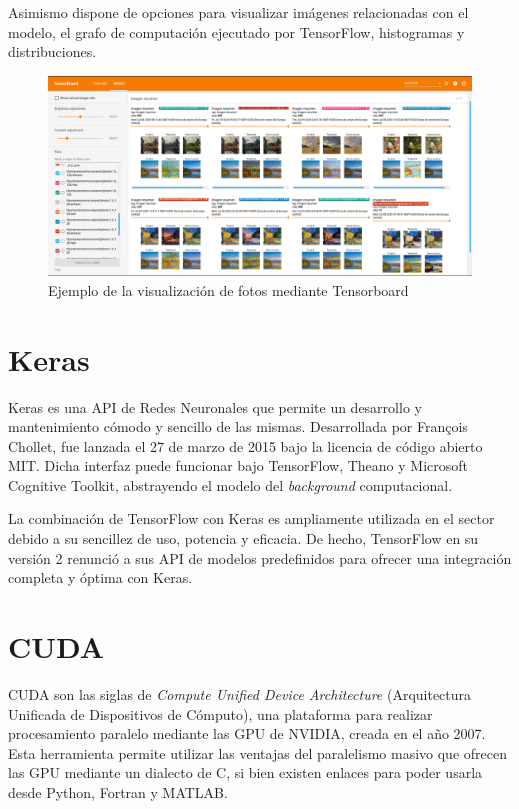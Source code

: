 \documentclass[../main.tex]{subfiles}
\begin{document}
Asimismo dispone de opciones para visualizar imágenes relacionadas con el modelo, el grafo de computación ejecutado por TensorFlow, histogramas y distribuciones.

\begin{figure}[h!]
    \centering
    \includegraphics[width=1\textwidth]{imagenes/Tensorboard_imagen_resumen.png}
    \caption{Ejemplo de la visualización de fotos mediante Tensorboard}
    \label{fig:tensorboard_descripcion_imagenes}
\end{figure}

\section{Keras}
Keras es una API de Redes Neuronales que permite un desarrollo y mantenimiento cómodo y sencillo de las mismas. Desarrollada por François Chollet, fue lanzada el 27 de marzo de 2015 bajo la licencia de código abierto MIT. Dicha interfaz puede funcionar bajo TensorFlow, Theano y Microsoft Cognitive Toolkit, abstrayendo el modelo del \textit{background} computacional.
\newline

La combinación de TensorFlow con Keras es ampliamente utilizada en el sector debido a su sencillez de uso, potencia y eficacia. De hecho, TensorFlow en su versión 2 renunció a sus API de modelos predefinidos para ofrecer una integración completa y óptima con Keras.

\section{CUDA}

CUDA son las siglas de \textit{Compute Unified Device Architecture} (Arquitectura Unificada de Dispositivos de Cómputo), una plataforma para realizar procesamiento paralelo mediante las GPU de NVIDIA, creada en el año 2007. Esta herramienta permite utilizar las ventajas del paralelismo masivo que ofrecen las GPU mediante un dialecto de C, si bien existen enlaces para poder usarla desde Python, Fortran y MATLAB.
\newline
\end{document}
